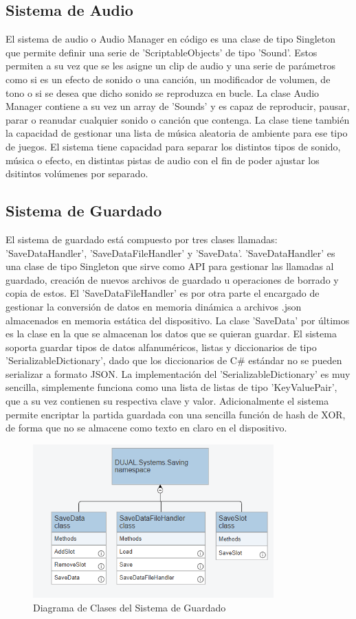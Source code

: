 \subsection{Sistema de Audio}
El sistema de audio o Audio Manager en código es una clase de tipo Singleton que permite definir una serie de 'ScriptableObjects' de tipo 'Sound'. Estos permiten a su vez que 
se les asigne un clip de audio y una serie de parámetros como si es un efecto de sonido o una canción, un modificador de volumen, de tono o si se desea que dicho sonido 
se reproduzca en bucle. La clase Audio Manager contiene a su vez un array de 'Sounds' y es capaz de reproducir, pausar, parar o reanudar cualquier sonido o canción que contenga. 
La clase tiene también la capacidad de gestionar una lista de música aleatoria de ambiente para ese tipo de juegos. El sistema tiene capacidad para separar los distintos tipos de 
sonido, música o efecto, en distintas pistas de audio con el fin de poder ajustar los dsitintos volúmenes por separado.    

\subsection{Sistema de Guardado}
El sistema de guardado está compuesto por tres clases llamadas: 'SaveDataHandler', 'SaveDataFileHandler' y 'SaveData'. 'SaveDataHandler' es una clase de tipo Singleton que 
sirve como API para gestionar las llamadas al guardado, creación de nuevos archivos de guardado u operaciones de borrado y copia de estos. El 'SaveDataFileHandler' es por 
otra parte el encargado de gestionar la conversión de datos en memoria dinámica a archivos .json almacenados en memoria estática del dispositivo. La clase 'SaveData' por últimos
es la clase en la que se almacenan los datos que se quieran guardar. El sistema soporta guardar tipos de datos alfanuméricos, listas y diccionarios de tipo 
'SerializableDictionary', dado que los diccionarios de C\# estándar no se pueden serializar a formato JSON. La implementación del 'SerializableDictionary' es muy sencilla, 
simplemente funciona como una lista de listas de tipo 'KeyValuePair', que a su vez contienen su respectiva clave y valor. Adicionalmente el sistema permite encriptar la 
partida guardada con una sencilla función de hash de XOR, de forma que no se almacene como texto en claro en el dispositivo.  

\begin{figure}[H]
  \centering
    \includegraphics[width=350px,clip=true]{Saving.png}
  \caption{Diagrama de Clases del Sistema de Guardado}
  \label{fig:savinguml}
\end{figure}

